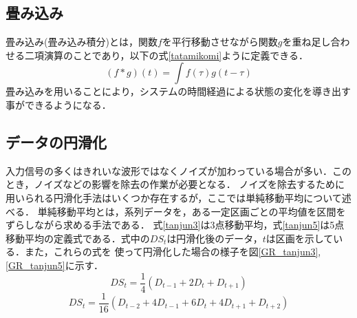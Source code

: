 \documentclass[a4paper,11pt]{jsarticle}
\begin{document}
  \subsection{畳み込み}
    畳み込み(畳み込み積分)\cite{tatamikomi}とは，関数$f$を平行移動させながら関数$g$を重ね足し合わせる二項演算のことであり，以下の式\ref{tatamikomi}ように定義できる．
    \begin{equation}
      (f * g)(t) = \int{f(\tau)g(t-\tau)} \nonumber   \label{tatamikomi}
    \end{equation}
    畳み込みを用いることにより，システムの時間経過による状態の変化を導き出す事ができるようになる．

  \subsection{データの円滑化}
    入力信号の多くはきれいな波形ではなくノイズが加わっている場合が多い．このとき，ノイズなどの影響を除去の作業が必要となる．
    ノイズを除去するために用いられる円滑化手法はいくつか存在するが，ここでは単純移動平均について述べる．
    単純移動平均とは，系列データを，ある一定区画ごとの平均値を区間をずらしながら求める手法である．
    式\ref{tanjun3}は3点移動平均，式\ref{tanjun5}は5点移動平均の定義式である．式中の$DS_t$は円滑化後のデータ，$t$は区画を示している．また，これらの式を
    使って円滑化した場合の様子を図\ref{GR_tanjun3},\ref{GR_tanjun5}に示す．
    \begin{equation}
      DS_t = \frac{1}{4}(D_{t-1} + 2D_t + D_{t+1}) \label{tanjun3}
    \end{equation}
    \begin{equation}
      DS_t = \frac{1}{16}(D_{t-2} + 4D_{t-1} + 6D_t + 4D_{t+1} + D_{t+2}) \label{tanjun5}
    \end{equation}
\end{document}
